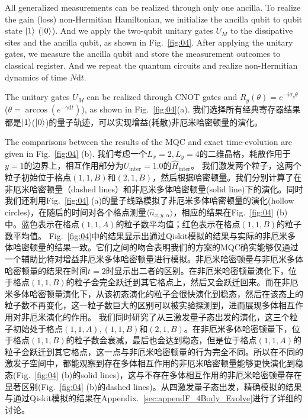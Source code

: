 \documentclass[longbibliography, aps, prx, amsmath, amssymb, amsfonts, twocolumn,superscriptaddress, footinbib]{revtex4-1}
\begin{document}
	All generalized measurements can be realized through only one ancilla. To realize the gain (loss) non-Hermitian Hamiltonian, we initialize the ancilla qubit to qubit state $\ket{1}$ ($\ket{0}$). And we apply the two-qubit unitary gates $U_M$ to the dissipative sites and the ancilla qubit, as shown in Fig.~\ref{fig:04}. After applying the unitary gates, we measure the ancilla qubit and store the measurement outcomes to classical register. And we repeat the quantum circuits and realize non-Hermitian dynamics of time $N\mathrm{d}t$.
	
	The unitary gates $U_M$ can be realized through CNOT gates and $R_y(\theta) = e^{-i\sigma_y\theta}$ ($\theta = \arccos(e^{-\gamma \mathrm{d}t})$), as shown in Fig.~\ref{fig:04}(a). 我们选择所有经典寄存器结果都是$\ket{1}$($\ket{0}$)的量子轨迹，可以实现增益(耗散)非厄米哈密顿量的演化。

	The comparisons between the results of the MQC and exact time-evolution are given in Fig.~\ref{fig:04} (b). 我们考虑一个$L_x=2,L_y=4$的二维晶格，耗散作用于$y=1$的边界上，相互作用部分为$U_{\text{inter}}=1.0$的$\hat{H}_{\text{inter}}$。
	我们激发两个粒子，这两个粒子初始位于格点$(1,1,B)$和$(2,1,B)$，然后根据哈密顿量。我们分别计算了在非厄米哈密顿量（dashed lines）和非厄米多体哈密顿量(solid line)下的演化。同时我们还利用Fig.~\ref{fig:04} (a)的量子线路模拟了非厄米多体哈密顿量的演化(hollow circles)，在随后的时间对各个格点测量$\langle \hat{n}_{x,y,\alpha}\rangle$，相应的结果在Fig.~\ref{fig:04} (b)中。蓝色表示在格点$(1,1,A)$的粒子数平均值；红色表示在格点$(1,1,B)$的粒子数平均值。
	Fig.~\ref{fig:04}中的结果显示出通过Qiskit模拟的结果与实际的非厄米多体哈密顿量的结果一致。它们之间的吻合表明我们的方案的MQC确实能够仅通过一个辅助比特对增益非厄米多体哈密顿量进行模拟。非厄米哈密顿量与非厄米多体哈密顿量的结果在时间$t=2$时显示出二者的区别。在非厄米哈密顿量演化下，位于格点$(1,1,B)$的粒子会完全跃迁到其它格点上，然后又会跃迁回来。而在非厄米多体哈密顿量演化下，从该初态演化的粒子会很快演化到稳态，然后在该态上的粒子数不再变化，这一粒子数巨大的区别可以被实验探测到，进而展现多体相互作用对非厄米演化的作用。
	我们同时研究了从三激发量子态出发的演化，这三个粒子初始处于格点$(1,1,A),(1,1,B)$和$(2,1,B)$。在非厄米多体哈密顿量下，位于格点$(1,1,B)$的粒子数会衰减，最后也会达到稳态，但是位于格点$(1,1,A)$的粒子会跃迁到其它格点，这一点与非厄米哈密顿量的行为完全不同。所以在不同的激发子空间中，都能观察到存在多体相互作用的非厄米哈密顿量能够更快演化到稳态(Fig.~\ref{fig:04} (b)的solid lines)，这与不存在多体相互作用的非厄米哈密顿量存在显著区别(Fig.~\ref{fig:04} (b)的dashed lines)。从四激发量子态出发，精确模拟的结果与通过Qiskit模拟的结果在Appendix.~\ref{sec:appendF_4Body_Evolve}进行了详细的讨论。
\end{document}
